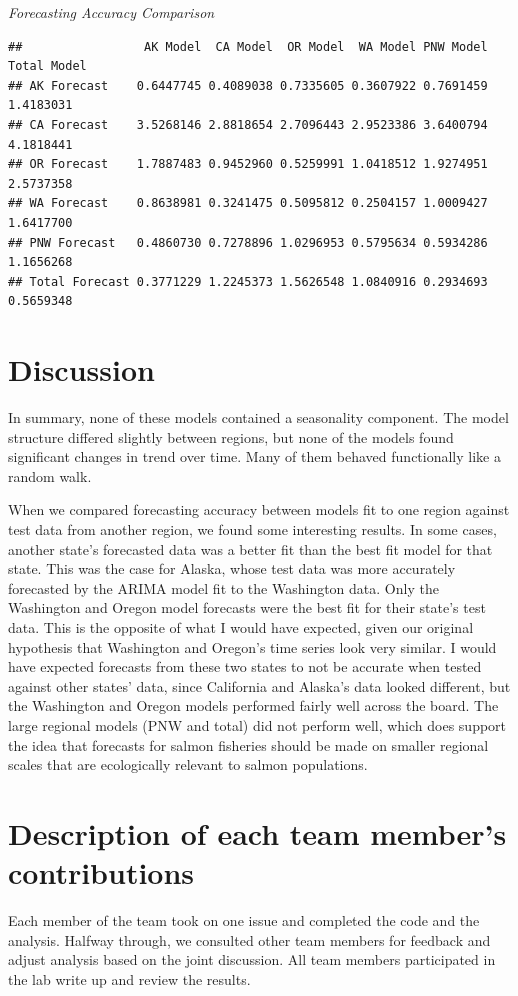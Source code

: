 \documentclass[
]{article}
\begin{document}
\emph{Forecasting Accuracy Comparison}

\begin{verbatim}
##                 AK Model  CA Model  OR Model  WA Model PNW Model Total Model
## AK Forecast    0.6447745 0.4089038 0.7335605 0.3607922 0.7691459   1.4183031
## CA Forecast    3.5268146 2.8818654 2.7096443 2.9523386 3.6400794   4.1818441
## OR Forecast    1.7887483 0.9452960 0.5259991 1.0418512 1.9274951   2.5737358
## WA Forecast    0.8638981 0.3241475 0.5095812 0.2504157 1.0009427   1.6417700
## PNW Forecast   0.4860730 0.7278896 1.0296953 0.5795634 0.5934286   1.1656268
## Total Forecast 0.3771229 1.2245373 1.5626548 1.0840916 0.2934693   0.5659348
\end{verbatim}

\section{Discussion}\label{discussion}

In summary, none of these models contained a seasonality component. The
model structure differed slightly between regions, but none of the
models found significant changes in trend over time. Many of them
behaved functionally like a random walk.

When we compared forecasting accuracy between models fit to one region
against test data from another region, we found some interesting
results. In some cases, another state's forecasted data was a better fit
than the best fit model for that state. This was the case for Alaska,
whose test data was more accurately forecasted by the ARIMA model fit to
the Washington data. Only the Washington and Oregon model forecasts were
the best fit for their state's test data. This is the opposite of what I
would have expected, given our original hypothesis that Washington and
Oregon's time series look very similar. I would have expected forecasts
from these two states to not be accurate when tested against other
states' data, since California and Alaska's data looked different, but
the Washington and Oregon models performed fairly well across the board.
The large regional models (PNW and total) did not perform well, which
does support the idea that forecasts for salmon fisheries should be made
on smaller regional scales that are ecologically relevant to salmon
populations.

\section{Description of each team member's
contributions}\label{description-of-each-team-members-contributions}

Each member of the team took on one issue and completed the code and the
analysis. Halfway through, we consulted other team members for feedback
and adjust analysis based on the joint discussion. All team members
participated in the lab write up and review the results.
\end{document}

